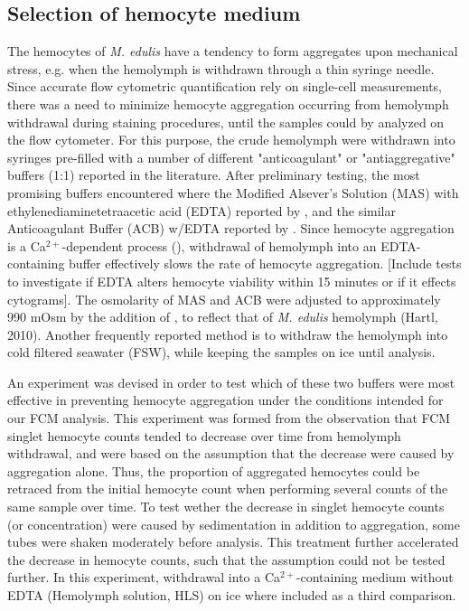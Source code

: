 \subsection{Selection of hemocyte medium}
The hemocytes of \emph{M. edulis} have a tendency to form aggregates upon mechanical stress, e.g. when the hemolymph is withdrawn through a thin syringe needle. Since accurate flow cytometric quantification rely on single-cell measurements, there was a need to minimize hemocyte aggregation occurring from hemolymph withdrawal during staining procedures, until the samples could by analyzed on the flow cytometer. For this purpose, the crude hemolymph were withdrawn into syringes pre-filled with a number of different "anticoagulant" or "antiaggregative" buffers (1:1) reported in the literature. After preliminary testing, the most promising buffers encountered where the Modified Alsever's Solution (MAS) with ethylenediaminetetraacetic acid (EDTA) reported by \cite{LeFoll2010}, and the similar Anticoagulant Buffer (ACB) w/EDTA reported by \cite{Pipe1997}. Since hemocyte aggregation is a Ca$^{2+}$-dependent process (\cite{Rolton2020}), withdrawal of hemolymph into an EDTA-containing buffer effectively slows the rate of hemocyte aggregation. [Include tests to investigate if EDTA alters hemocyte viability within 15 minutes or if it effects cytograms]. The osmolarity of MAS and ACB were adjusted to approximately 990 mOsm by the addition of , to reflect that of \emph{M. edulis} hemolymph (Hartl, 2010). Another frequently reported method is to withdraw the hemolymph into cold filtered seawater (FSW), while keeping the samples on ice until analysis.

An experiment was devised in order to test which of these two buffers were most effective in preventing hemocyte aggregation under the conditions intended for our FCM analysis. This experiment was formed from the observation that FCM singlet hemocyte counts tended to decrease over time from hemolymph withdrawal, and were based on the assumption that the decrease were caused by aggregation alone. Thus, the proportion of aggregated hemocytes could be retraced from the initial hemocyte count when performing several counts of the same sample over time. To test wether the decrease in singlet hemocyte counts (or concentration) were caused by sedimentation in addition to aggregation, some tubes were shaken moderately before analysis. This treatment further accelerated the decrease in hemocyte counts, such that the assumption could not be tested further. In this experiment, withdrawal into a Ca$^{2+}$-containing medium without EDTA (Hemolymph solution, HLS) on ice where included as a third comparison.

